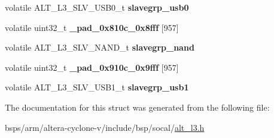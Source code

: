 \begin{DoxyCompactItemize}
\mbox{\label{structALT__L3__SLVGRP__s_a6c5649f7aa1b56227c1730e8259da38f}} 
volatile A\+L\+T\+\_\+\+L3\+\_\+\+S\+L\+V\+\_\+\+U\+S\+B0\+\_\+t {\bfseries slavegrp\+\_\+usb0}
\item 
\mbox{\label{structALT__L3__SLVGRP__s_a2c3d50bdafa44e864147f55f8c4074d7}} 
volatile uint32\+\_\+t {\bfseries \+\_\+pad\+\_\+0x810c\+\_\+0x8fff} \mbox{[}957\mbox{]}
\item 
\mbox{\label{structALT__L3__SLVGRP__s_a4e1dac07adf778359e00aed9eb5c74e3}} 
volatile A\+L\+T\+\_\+\+L3\+\_\+\+S\+L\+V\+\_\+\+N\+A\+N\+D\+\_\+t {\bfseries slavegrp\+\_\+nand}
\item 
\mbox{\label{structALT__L3__SLVGRP__s_acd5e2922889761e2696ab01636f4091b}} 
volatile uint32\+\_\+t {\bfseries \+\_\+pad\+\_\+0x910c\+\_\+0x9fff} \mbox{[}957\mbox{]}
\item 
\mbox{\label{structALT__L3__SLVGRP__s_a722687b6a52af519ceae78731f5ae2d6}} 
volatile A\+L\+T\+\_\+\+L3\+\_\+\+S\+L\+V\+\_\+\+U\+S\+B1\+\_\+t {\bfseries slavegrp\+\_\+usb1}
\end{DoxyCompactItemize}


The documentation for this struct was generated from the following file\+:\begin{DoxyCompactItemize}
\item 
bsps/arm/altera-\/cyclone-\/v/include/bsp/socal/\mbox{\hyperlink{alt__l3_8h}{alt\+\_\+l3.\+h}}\end{DoxyCompactItemize}
